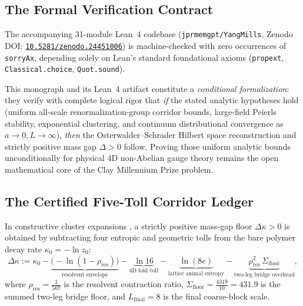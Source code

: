 \subsection{The Formal Verification Contract}
The accompanying 31-module Lean~4 codebase (\texttt{jprmemgpt/YangMills}, Zenodo DOI: \href{https://doi.org/10.5281/zenodo.24451006}{\texttt{10.5281/zenodo.24451006}}) is machine-checked with zero occurrences of \texttt{sorryAx}, depending solely on Lean's standard foundational axioms (\texttt{propext}, \texttt{Classical.choice}, \texttt{Quot.sound}).

\begin{remark}
This monograph and its Lean~4 artifact constitute a \emph{conditional formalization}: they verify with complete logical rigor that \emph{if} the stated analytic hypotheses hold (uniform all-scale renormalization-group corridor bounds, large-field Peierls stability, exponential clustering, and continuum distributional convergence as $a \to 0, L \to \infty$), \emph{then} the Osterwalder--Schrader Hilbert space reconstruction and strictly positive mass gap $\Delta > 0$ follow. Proving those uniform analytic bounds unconditionally for physical 4D non-Abelian gauge theory remains the open mathematical core of the Clay Millennium Prize problem.
\end{remark}

\subsection{The Certified Five-Toll Corridor Ledger}
In constructive cluster expansions \cite{KoteckyPreiss1986,Brydges1986}, a strictly positive mass-gap floor $\Delta\kappa > 0$ is obtained by subtracting four entropic and geometric tolls from the bare polymer decay rate $\kappa_0 = -\ln z_0$:
\begin{equation}
\Delta\kappa := \kappa_0 - \underbrace{\big(-\ln(1 - \rho_{\mathrm{res}})\big)}_{\text{resolvent envelope}} - \underbrace{\ln 16}_{\text{4D fold toll}} - \underbrace{\ln(8e)}_{\text{lattice animal entropy}} - \underbrace{\rho_{\mathrm{res}}^2 \, \Sigma_{\mathrm{floor}}}_{\text{two-leg bridge overhead}},
\end{equation}
where $\rho_{\mathrm{res}} = \frac{1}{567}$ is the resolvent contraction ratio, $\Sigma_{\mathrm{floor}} = \frac{4319}{10} = 431.9$ is the summed two-leg bridge floor, and $L_{\mathrm{final}} = 8$ is the final coarse-block scale.

